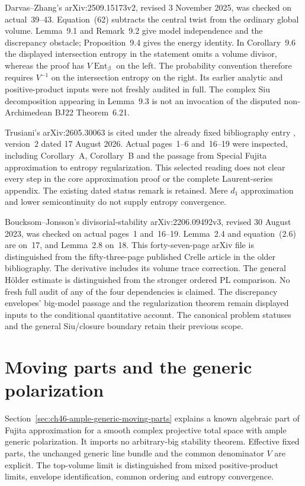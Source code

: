 Darvas--Zhang's arXiv:2509.15173v2, revised 3 November 2025,
was checked on actual~39--43. Equation~(62) subtracts the central
twist from the ordinary global volume. Lemma~9.1 and Remark~9.2
give model independence and the discrepancy obstacle;
Proposition~9.4 gives the energy identity. In Corollary~9.6
the displayed intersection entropy in the statement omits a
volume divisor, whereas the proof has $V\operatorname{Ent}_\beta$
on the left. The probability convention therefore requires
$V^{-1}$ on the intersection entropy on the right.
Its earlier analytic and positive-product inputs were not freshly
audited in full. The complex Siu decomposition appearing in
Lemma~9.3 is not an invocation of the disputed non-Archimedean
BJ22 Theorem~6.21.

Trusiani's arXiv:2605.30063 is cited under the already
fixed bibliography entry \cite{Trusiani26}, version~2 dated
17 August 2026. Actual pages~1--6 and~16--19 were inspected,
including Corollary~A, Corollary~B and the passage from Special
Fujita approximation to entropy regularization. This selected
reading does not clear every step in the core approximation proof
or the complete Laurent-series appendix. The existing dated
status remark is retained. Mere $d_1$ approximation and lower
semicontinuity do not supply entropy convergence.

Boucksom--Jonsson's divisorial-stability arXiv:2206.09492v3,
revised 30 August 2023, was checked on actual pages~1 and~16--19.
Lemma~2.4 and equation~(2.6) are on~17, and Lemma~2.8 on~18.
This forty-seven-page arXiv file is distinguished from the
fifty-three-page published Crelle article in the older bibliography.
The derivative includes its volume trace correction. The general
H\"older estimate is distinguished from the stronger ordered
PL comparison. No fresh full audit of any of the four dependencies
is claimed. The discrepancy envelopes' big-model passage and the
regularization theorem remain displayed inputs to the conditional
quantitative account. The canonical problem statuses and the
general Siu/closure boundary retain their previous scope.

\section{Moving parts and the generic polarization}
\label{sec:provenance-ample-generic-moving-parts}

Section~\ref{sec:ch46-ample-generic-moving-parts} explains a known
algebraic part of Fujita approximation for a smooth complex projective
total space with ample generic polarization. It imports no arbitrary-big
stability theorem. Effective fixed parts, the unchanged generic line
bundle and the common denominator $V$ are explicit. The top-volume
limit is distinguished from mixed positive-product limits, envelope
identification, common ordering and entropy convergence.

